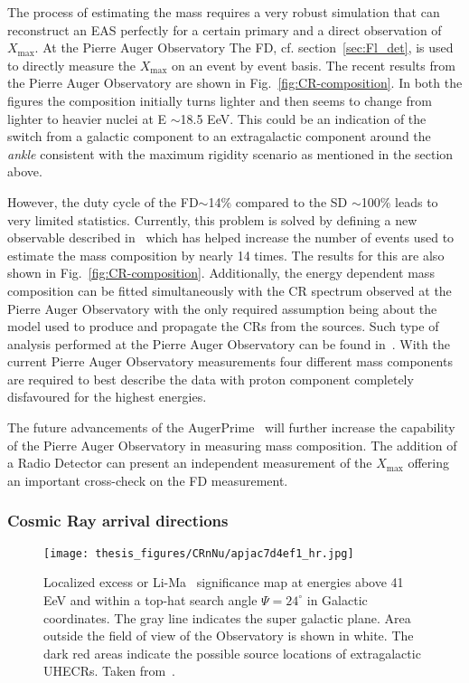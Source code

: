The process of estimating the mass requires a very robust simulation that can reconstruct an EAS perfectly for a certain primary and a direct observation of $X_{\text{max}}$. At the Pierre Auger Observatory The \gls{FD}, cf. section~\ref{sec:Fl_det}, is used to directly measure the $X_{\text{max}}$ on an event by event basis. The recent results from the Pierre Auger Observatory are shown in Fig.~\ref{fig:CR-composition}. In both the figures the composition initially turns lighter and then seems to change from lighter to heavier nuclei at E $\sim$18.5 EeV. This could be an indication of the switch from a galactic component to an extragalactic component around the \textit{ankle} consistent with the maximum rigidity scenario as mentioned in the section above.

However, the duty cycle of the \gls{FD}$\sim$14\% compared to the \gls{SD} $\sim$100\% leads to very limited statistics. Currently, this problem is solved by defining a new observable described in~\cite{2017arXiv171007249T} which has helped increase the number of events used to estimate the mass composition by nearly 14 times. The results for this are also shown in Fig.~\ref{fig:CR-composition}. Additionally, the energy dependent mass composition can be fitted simultaneously with the \gls{CR} spectrum observed at the Pierre Auger Observatory with the only required assumption being about the model used to produce and propagate the \glspl{CR} from the sources. Such type of analysis performed at the Pierre Auger Observatory can be found in~\cite{2018_auger_comp_spec}. With the current Pierre Auger Observatory measurements four different mass components are required to best describe the data with proton component completely disfavoured for the highest energies.

The future advancements of the AugerPrime~\cite{ANASTASI2022167497} will further increase the capability of the Pierre Auger Observatory in measuring mass composition. The addition of a Radio Detector can present an independent measurement of the $X_{\text{max}}$ offering an important cross-check on the \gls{FD} measurement. 

\subsubsection*{Cosmic Ray arrival directions}
\label{subsubsec:CRdirec}
\begin{figure}[t!]
  \centering
  \texttt{[image: thesis\_figures/CRnNu/apjac7d4ef1\_hr.jpg]}
  \caption{Localized excess or Li-Ma~\cite{Li:1983fv} significance map at energies above 41 EeV and within a top-hat search angle $\Psi = 24^\circ$ in Galactic coordinates. The gray line indicates the super galactic plane. Area outside the field of view of the Observatory is shown in white. The dark red areas indicate the possible source locations of extragalactic \glspl{UHECR}. Taken from~\cite{Abreu_2022}.}
  \label{fig:CR-anisotropy}
\end{figure}

